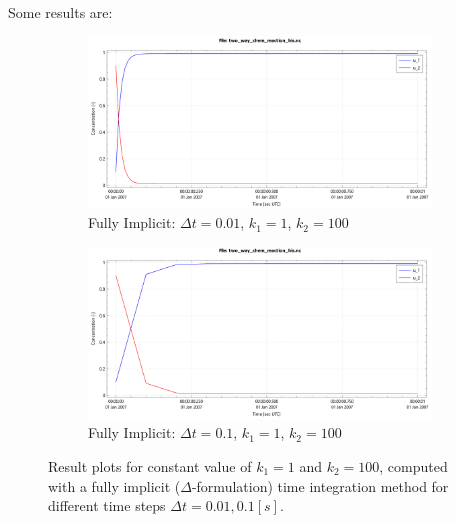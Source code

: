 \documentclass{mooiman_memo}
\newcommand{\Dt}{\Delta t}
\begin{document}
%
%
Some results are:
\begin{figure}[H]
    \begin{subfigure}{0.49\textwidth}
        \includegraphics[width=\textwidth]{figures/two_way_chem_reaction_imp_dt=0d01.pdf}
        \caption{Fully Implicit: $\Dt=0.01$, $k_1=1$, $k_2=100$}\label{fig:imp_dt=1d00}
    \end{subfigure}
    \hfill
    \begin{subfigure}{0.49\textwidth}
        \includegraphics[width=\textwidth]{figures/two_way_chem_reaction_imp_dt=0d10.pdf}
        \caption{Fully Implicit: $\Dt=0.1$, $k_1=1$, $k_2=100$}\label{fig:imp_dt=5d00}
    \end{subfigure}
    \caption{Result plots for constant value of $k_1 = 1$ and $k_2 =100$, computed with a fully implicit ($\Delta$-formulation) time integration method for different time steps $\Dt = 0.01, 0.1 [s]$.
    }
\end{figure}
%
\end{document}
